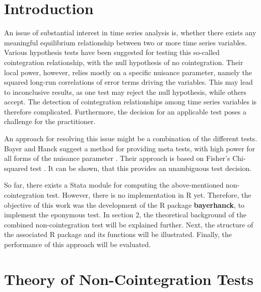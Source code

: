\documentclass[11.5pt,a4paper]{article}
\begin{document}
\restoregeometry


{
\hypersetup{linkcolor=black}
\setcounter{tocdepth}{3}
\tableofcontents
}
\newpage
\listoftables
\newpage
\listoffigures
\newpage
{} 
\hypertarget{introduction}{%
\section{Introduction}\label{introduction}}

An issue of substantial interest in time series analysis is, whether
there exists any meaningful equilibrium relationship between two or more
time series variables. Various hypothesis tests have been suggested for
testing this so-called cointegration relationship, with the null
hypothesis of no cointegration. Their local power, however, relies
mostly on a specific nuisance parameter, namely the squared long-run
correlations of error terms driving the variables. This may lead to
inconclusive results, as one test may reject the null hypothesis, while
others accept. The detection of cointegration relationships among time
series variables is therefore complicated. Furthermore, the decision for
an applicable test poses a challenge for the practitioner.

An approach for resolving this issue might be a combination of the
different tests. Bayer and Hanck suggest a method for providing meta
tests, with high power for all forms of the nuisance parameter
\autocite{Bayerhanck2009}. Their approach is based on Fisher's
Chi-squared test \autocite{Fisher1925}. It can be shown, that this
provides an unambiguous test decision.

So far, there exists a Stata module for computing the above-mentioned
non-cointegration test. However, there is no implementation in R yet.
Therefore, the objective of this work was the development of the R
package \textbf{bayerhanck}, to implement the eponymous test. In section
2, the theoretical background of the combined non-cointegration test
will be explained further. Next, the structure of the associated R
package and its functions will be illustrated. Finally, the performance
of this approach will be evaluated.

\hypertarget{theory-of-non-cointegration-tests}{%
\section{Theory of Non-Cointegration
Tests}\label{theory-of-non-cointegration-tests}}
\end{document}
